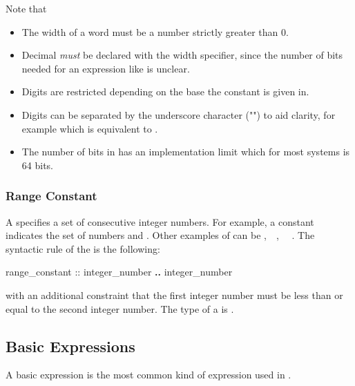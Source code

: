 \label{the notes on word constants}
\noindent Note that 

\begin{itemize}
  \item The width of a word must be a number strictly greater than 0. 
  \item Decimal  \textit{must} be declared
        with the width specifier, since the number of bits needed for
        an expression like  is unclear.
  \item Digits are restricted depending on the base the constant is
        given in.
  \item Digits can be separated by the underscore character
        ("{\code{\_}}") to aid clarity, for example
         which is equivalent to
        .
 \item The number of bits in  has an implementation
       limit which for most systems is 64 bits.
\end{itemize}

\subsubsection{Range Constant}
\label{Range Constant}

A  specifies a set of consecutive integer
numbers. For example, a constant  indicates the set of
numbers  and . Other examples of
 can be ,\ \ ,
\ \ . 
The syntactic rule of the  is the following:
\begin{Grammar}
range_constant :: 
        integer_number \textbf{..} integer_number
\end{Grammar}
with an additional constraint that the first integer number must be
less than or equal to the second integer number.
%
The type of a  is \IntSet.

\subsection{Basic Expressions}
\label{Basic Expressions}


A basic expression is the most common kind of expression used in
\nusmv.

